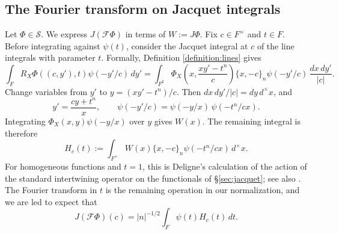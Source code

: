 \documentclass[reqno]{amsart}
\theoremstyle{plain}
\theoremstyle{definition}
\theoremstyle{itplain}
\numberwithin{equation}{section}
\numberwithin{theorem}{section}
\begin{document}
\subsection{The Fourier transform on Jacquet integrals}\label{sec:line-transform}
Let $\Phi \in \mathcal{S}$.  We express $J(\mathcal{F} \Phi)$ in terms of $W := J \Phi$.  Fix $c \in F^\times$ and $t \in F$.  Before integrating against $\psi(t)$, consider the Jacquet integral at $c$ of the line integrals with parameter $t$.  Formally, Definition \ref{definition:lines} gives
\begin{equation*}
  \int_F R_X \Phi((c, y'), t) \psi(-y'/c) \, d y'
  = \int_{F^2} \Phi_X \left(x, \frac{x y' - t^n}{c}\right) \{x, -c\}_n \psi(-y'/c) \, \frac{d x \, d y'}{\lvert c \rvert}.
\end{equation*}
Change variables from $y'$ to $y = (x y' - t^n)/c$.  Then $d x \, d y' / \lvert c \rvert = d y \, d^\times x$, and
\begin{equation*}
  y' = \frac{c y + t^n}{x},
  \qquad
  \psi(- y' / c) = \psi(- y / x) \, \psi(- t^n / c x).
\end{equation*}
Integrating $\Phi_X(x, y) \psi(-y/x)$ over $y$ gives $W(x)$.  The remaining integral is therefore
\begin{equation}\label{eq:jacquet-kernel}
  H_c(t) := \int_{F^\times} W(x) \{x, -c\}_n \psi(- t^n / c x) \, d^\times x.
\end{equation}
For homogeneous functions and $t = 1$, this is Deligne's calculation \cite[(6.5.4)]{SB_1978-1979__21__244_0} of the action of the standard intertwining operator on the functionals of \S\ref{sec:jacquet}; see also \cite{Szpruch2019, GaoShahidiSzpruch2023}.  The Fourier transform in $t$ is the remaining operation in our normalization, and we are led to expect that
\begin{equation}\label{eq:jacquet-formal}
  J(\mathcal{F} \Phi)(c) = \lvert n \rvert^{-1/2} \int_F \psi(t) H_c(t) \, d t.
\end{equation}
\end{document}
